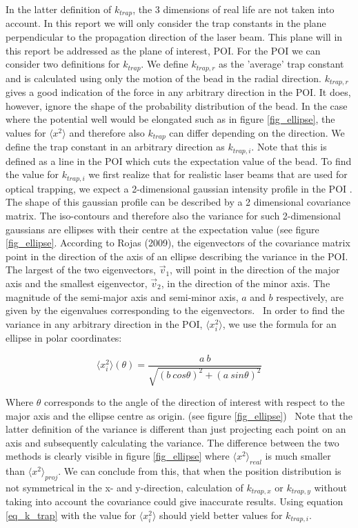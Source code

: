 In the latter definition of $k_{trap}$, the 3 dimensions of real life are not taken into account. In this report we will only consider the trap constants in the plane perpendicular to the propagation direction of the laser beam. This plane will in this report be addressed as the plane of interest, POI. For the POI we can consider two definitions for $k_{trap}$. We define $k_{trap,r}$ as the 'average' trap constant and is calculated using only the motion of the bead in the radial direction. $k_{trap,r}$ gives a good indication of the force in any arbitrary direction in the POI. It does, however, ignore the shape of the probability distribution of the bead. In the case where the potential well would be elongated such as in figure \ref{fig_ellipse}, the values for $ \langle x^2 \rangle $ and therefore also $k_{trap}$ can differ depending on the direction. We define the trap constant in an arbitrary direction as $k_{trap,i}$. Note that this is defined as a line in the POI which cuts the expectation value of the bead. To find the value for $k_{trap,i}$ we first realize that for realistic laser beams that are used for optical trapping, we expect a 2-dimensional gaussian intensity profile in the POI \cite{shaevitz}. The shape of this gaussian profile can be described by a 2 dimensional covariance matrix. The iso-contours and therefore also the variance for such 2-dimensional gaussians are ellipses with their centre at the expectation value \cite{chuong} (see figure \ref{fig_ellipse}. According to Rojas (2009), the eigenvectors of the covariance matrix point in the direction of the axis of an ellipse describing the variance in the POI. The largest of the two eigenvectors, $\vec{v}_1$, will point in the direction of the major axis and the smallest eigenvector, $\vec{v}_2$, in the direction of the minor axis. The magnitude of the semi-major axis and semi-minor axis, $a$ and $b$ respectively, are given by the eigenvalues corresponding to the eigenvectors.\cite{rojas} \
In order to find the variance in any arbitrary direction in the POI,  $ \langle x_i^2 \rangle$, we use the formula for an ellipse in polar coordinates:
\label{alternate_method}

\begin{equation}
	 \langle x_i^2 \rangle ( \theta ) = \frac{a \: b}{\sqrt{( b \: cos\theta)^2 + (a \: sin\theta )^2}}
\end{equation}

Where $\theta$ corresponds to the angle of the direction of interest with respect to the major axis and the ellipse centre as origin. (see figure \ref{fig_ellipse}) \
Note that the latter definition of the variance is different than just projecting each point on an axis and subsequently calculating the variance. The difference between the two methods is clearly visible in figure \ref{fig_ellipse} where $\langle x^2 \rangle _{real}$ is much smaller than $\langle x^2 \rangle _{proj}$. We can conclude from this, that when the position distribution is not symmetrical in the x- and y-direction, calculation of $k_{trap,x}$ or $k_{trap,y}$ without taking into account the covariance could give inaccurate results. Using equation \ref{eq_k_trap} with the value for $  \langle x_i^2 \rangle $ should yield better values for $k_{trap,i}$.



